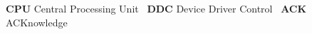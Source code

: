 {\bfseries C\+P\+U} Central Processing Unit~\newline
 {\bfseries D\+D\+C} Device Driver Control~\newline
 {\bfseries A\+C\+K} A\+C\+Knowledge~\newline
 